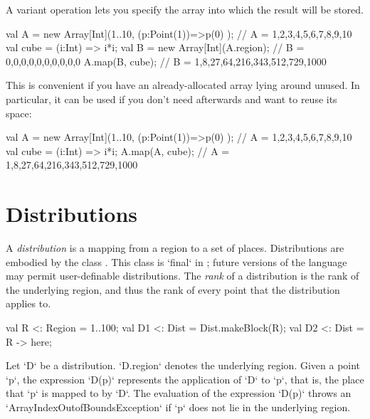 {A variant operation lets you specify the array  into which the result
will be stored.   
\begin{xten}
val A = new Array[Int](1..10, (p:Point(1))=>p(0) );
// A = 1,2,3,4,5,6,7,8,9,10
val cube = (i:Int) => i*i;
val B = new Array[Int](A.region); // B = 0,0,0,0,0,0,0,0,0,0
A.map(B, cube);
// B = 1,8,27,64,216,343,512,729,1000
\end{xten}
\noindent
This is convenient if you have an already-allocated array lying around unused.
In particular, it can be used if you don't need  afterwards and want to
reuse its space:
\begin{xten}
val A = new Array[Int](1..10, (p:Point(1))=>p(0) );
// A = 1,2,3,4,5,6,7,8,9,10
val cube = (i:Int) => i*i;
A.map(A, cube);
// A = 1,8,27,64,216,343,512,729,1000
\end{xten}


\section{Distributions}\label{XtenDistributions}

A {\em distribution} is a mapping from a region to a set of places.
Distributions are embodied by the class .
This class is \xcd`final` in
{}\XtenCurrVer; future versions of the language may permit
user-definable distributions. 
The {\em rank} of a distribution is the rank of the underlying region, and
thus the rank of every point that the distribution applies to.



\begin{xten}
val R  <: Region = 1..100;
val D1 <: Dist = Dist.makeBlock(R);
val D2 <: Dist = R -> here;
\end{xten}

Let \xcd`D` be a distribution. 
\xcd`D.region` 
denotes the underlying
region. 
Given a point \xcd`p`, the expression
\xcd`D(p)` represents the application of \xcd`D` to \xcd`p`, that is,
the place that \xcd`p` is mapped to by \xcd`D`. The evaluation of the
expression \xcd`D(p)` throws an \xcd`ArrayIndexOutofBoundsException`
if \xcd`p` does not lie in the underlying region.


}
